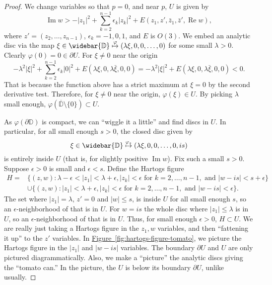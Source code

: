 \documentclass[12pt,openany]{book}
\renewcommand{\Re}{\operatorname{Re}}
\renewcommand{\Im}{\operatorname{Im}}
\newcommand{\sabs}[1]{\lvert {#1} \rvert}
\newcommand{\D}{{\mathbb{D}}}
\theoremstyle{plain}
\theoremstyle{remark}
\theoremstyle{definition}
\theoremstyle{exercise}
\theoremstyle{example}
\newcommand{\figureref}[1]{\hyperref[#1]{Figure~\ref*{#1}}}
\begin{document}
\begin{proof}
We change variables so that $p = 0$, and
near $p$, $U$ is given by
\begin{equation*}
\Im w > -\sabs{z_1}^2 + \sum_{k=2}^{n-1} \epsilon_k \sabs{z_k}^2 +
E(z_1,z',\bar{z}_1,\bar{z}',\Re w) ,
\end{equation*}
where $z' = (z_2,\ldots,z_{n-1})$, $\epsilon_k = -1,0,1$, and $E$ is $O(3)$.
We embed an analytic disc via the map
$\xi \in \widebar{\D} \overset{\varphi}{\mapsto} (\lambda \xi, 0, 0, \ldots, 0)$
for some small $\lambda > 0$.
Clearly $\varphi(0) = 0 \in \partial U$.  For $\xi \not= 0$ near the origin
\begin{equation*}
-\lambda^2 \sabs{\xi}^2 + \sum_{k=2}^{n-1} \epsilon_k \sabs{0}^2 + E(\lambda
\xi,0,\lambda \bar{\xi},0,0)
=
-\lambda^2 \sabs{\xi}^2 + E(\lambda
\xi,0,\lambda \bar{\xi},0,0)
< 0 .
\end{equation*}
That is because
the function above has a strict maximum at $\xi = 0$
by the second derivative test.
Therefore, for $\xi \not= 0$ near the origin,
$\varphi(\xi) \in U$.  By picking $\lambda$ small enough,
$\varphi(\overline{\D}\setminus\{0\}) \subset U$.

As $\varphi(\partial \D)$ is compact, we can ``wiggle it a little'' and
find discs in $U$.  In particular, for all small enough $s > 0$,
the closed disc given by
\begin{equation*}
\xi \in \widebar{\D} \overset{\varphi_s}{\mapsto} (\lambda \xi, 0, 0, \ldots, 0, i s)
\end{equation*}
is entirely inside $U$ (that is, for slightly positive $\Im w$).
Fix such a small $s > 0$.
Suppose $\epsilon > 0$ is small and $\epsilon < s$.
Define the Hartogs figure
\begin{equation*}
\begin{split}
H =
& \bigl\{ (z,w) : \lambda - \epsilon < \sabs{z_1} < \lambda + \epsilon,
\sabs{z_k} < \epsilon \text{ for } k=2,\ldots,n-1, \text{ and }
\sabs{w-is} < s+\epsilon \bigr\}
\\
&
\cup
\bigl\{ (z,w) : \sabs{z_1} < \lambda + \epsilon,
\sabs{z_k} < \epsilon \text{ for } k=2,\ldots,n-1, \text{ and }
\sabs{w-is} < \epsilon \bigr\} .
\end{split}
\end{equation*}
The set where $\sabs{z_1} = \lambda$, $z' = 0$
and $\sabs{w} \leq s$, is inside $U$ for all small enough $s$, so
an $\epsilon$-neighborhood of that is in $U$.
For
$w = is$ the whole disc where $\sabs{z_1} \leq \lambda$ is in $U$,
so an $\epsilon$-neighborhood of that is in $U$.
Thus, for small enough $\epsilon >0$, $H \subset U$.
We are really just taking a Hartogs figure in the $z_1,w$ variables, and then
``fattening it up'' to the $z'$ variables.
In \figureref{fig:hartogs-figure-tomato}, we picture the Hartogs figure in the $\sabs{z_1}$ and $\sabs{w-is}$
variables.  The boundary $\partial U$ and $U$ are only pictured diagrammatically.
Also, we make a ``picture'' the analytic discs giving the ``tomato can.''
In the picture, the $U$ is below its boundary $\partial U$, unlike usually.


\end{proof}
\end{document}

